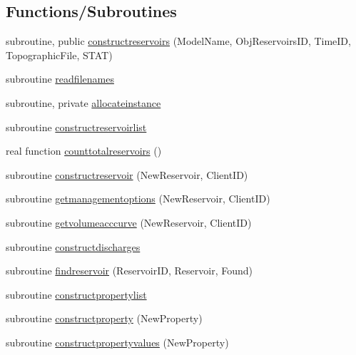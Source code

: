\subsection*{Functions/\+Subroutines}
\begin{DoxyCompactItemize}
\item 
subroutine, public \mbox{\hyperlink{namespacemodulereservoirs_a8356f95662b41d91816350cf3f3c6113}{constructreservoirs}} (Model\+Name, Obj\+Reservoirs\+ID, Time\+ID, Topographic\+File, S\+T\+AT)
\item 
subroutine \mbox{\hyperlink{namespacemodulereservoirs_a9ca6b6f1b29d44a299bd0cd902b875bd}{readfilenames}}
\item 
subroutine, private \mbox{\hyperlink{namespacemodulereservoirs_a3bbdfd18a9b8de49cb39c9c2e60824f5}{allocateinstance}}
\item 
subroutine \mbox{\hyperlink{namespacemodulereservoirs_ac7bcb5beebaa4c557e558719e9656911}{constructreservoirlist}}
\item 
real function \mbox{\hyperlink{namespacemodulereservoirs_ac5bf14d3b0efa223e5c19855bb2380f2}{counttotalreservoirs}} ()
\item 
subroutine \mbox{\hyperlink{namespacemodulereservoirs_adb0f83f2d398504e99ff31c83a07ff2b}{constructreservoir}} (New\+Reservoir, Client\+ID)
\item 
subroutine \mbox{\hyperlink{namespacemodulereservoirs_aa1e3cf305f3f33775d706fde19afd2c6}{getmanagementoptions}} (New\+Reservoir, Client\+ID)
\item 
subroutine \mbox{\hyperlink{namespacemodulereservoirs_af78ebbee661caa48931d2c60385bda27}{getvolumeacccurve}} (New\+Reservoir, Client\+ID)
\item 
subroutine \mbox{\hyperlink{namespacemodulereservoirs_a720deae8cfb3dc32643ce6afdfa4d187}{constructdischarges}}
\item 
subroutine \mbox{\hyperlink{namespacemodulereservoirs_aaff88903c37ba70d4b309e252229107b}{findreservoir}} (Reservoir\+ID, Reservoir, Found)
\item 
subroutine \mbox{\hyperlink{namespacemodulereservoirs_a96a0b204df7b8cbf62057d7868d8aaa1}{constructpropertylist}}
\item 
subroutine \mbox{\hyperlink{namespacemodulereservoirs_a67e585ed4eb36afe43471887a3a9744c}{constructproperty}} (New\+Property)
\item 
subroutine \mbox{\hyperlink{namespacemodulereservoirs_a45a6c59f07c2eaae456d1a07476b8b6c}{constructpropertyvalues}} (New\+Property)
\item 

\end{DoxyCompactItemize}
